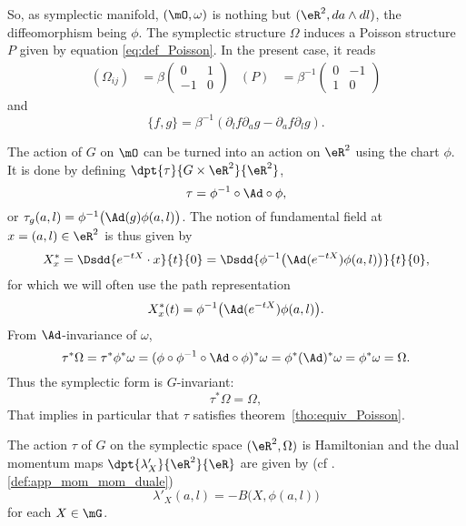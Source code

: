 So, as symplectic manifold, $(\mO,\omega)$ is nothing but $(\eR^2,da\wedge dl)$, the diffeomorphism being $\phi$. The symplectic structure $\Omega$ induces a Poisson structure $P$ given by equation \eqref{eq:def_Poisson}. In the present case, it reads
\begin{align}
(\Omega_{ij})&=\beta\begin{pmatrix}
0 & 1 \\
-1 & 0
\end{pmatrix}
&(P)&=\beta^{-1}\begin{pmatrix}
0 & -1 \\
1 & 0
\end{pmatrix}
\end{align}
 and
\begin{equation}\label{eq:Poisson}
  \{f,g\}=\beta^{-1}(\partial_lf\partial_ag-\partial_af\partial_lg).
\end{equation}

The action of $G$ on $\mO$ can be turned into an action on $\eR^2$ using the chart $\phi$. It is done by defining $\dpt{\tau}{G\times\eR^2}{\eR^2}$,
\begin{equation}
   \tau=\phi^{-1}\circ \Ad\circ\phi,
\end{equation}
or $\tau_g(a,l)=\phi^{-1}\big( \Ad(g)\phi(a,l)\big)$.  The notion of fundamental field at $x=(a,l)\in\eR^2$ is thus given by
\begin{equation}
  X^*_x=\Dsdd{e^{-tX}\cdot x}{t}{0}
       =\Dsdd{ \phi^{-1}\big( \Ad(e^{-tX})\phi(a,l)  \big) }{t}{0},
\end{equation}
for which we will often use the path representation
\[
   X^*_x(t)=\phi^{-1}\big( \Ad(e^{-tX})\phi(a,l)  \big).
\]
From $\Ad$-invariance of $\omega$,
\[
   \tau^*\Omega=\tau^*\phi^*\omega
               =(\phi\circ\phi^{-1}\circ \Ad\circ\phi)^*\omega
           =\phi^*(\Ad)^*\omega
           =\phi^*\omega
           =\Omega.
\]
Thus the symplectic form is $G$-invariant:
\begin{equation}     \label{eq:tau_s_Omega}
  \tau^*\Omega=\Omega,
\end{equation}
That implies in particular that $\tau$ satisfies theorem~\ref{tho:equiv_Poisson}.

\begin{proposition}
The action $\tau$ of $G$ on the symplectic space $(\eR^2,\Omega)$ is Hamiltonian and the dual momentum maps $\dpt{\lambda'_X}{\eR^2}{\eR}$ are given by (cf .\ref{def:app_mom_mom_duale})
\begin{equation}
  \lambda'_X(a,l)=-B\big(X,\phi(a,l)\big)
\end{equation}
for each $X\in\mG$.
\label{prop:lambda_X}
\end{proposition}

